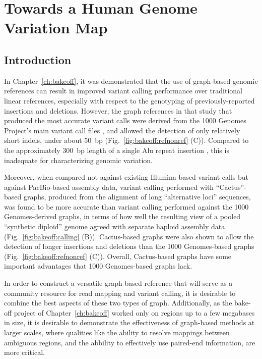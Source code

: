 \chapter{Towards a Human Genome Variation Map}

\newcommand{\vg}{\texttt{vg}\xspace}

\section{Introduction}

In Chapter~\ref{ch:bakeoff}, it was demonstrated that the use of graph-based genomic references can result in improved variant calling performance over traditional linear references, especially with respect to the genotyping of previously-reported insertions and deletions. However, the graph references in that study that produced the most accurate variant calls were derived from the 1000 Genomes Project's main variant call files \cite{10002015global}, and allowed the detection of only relatively short indels, under about 50~bp (Fig.~\ref{fig:bakeoff:refnonref} (C)). Compared to the approximately 300~bp length of a single Alu repeat insertion \cite{weiner1980abundant}, this is inadequate for characterizing genomic variation.

Moreover, when compared not against existing Illumina-based variant calls but against PacBio-based assembly data, variant calling performed with ``Cactus''-based graphs, produced from the alignment of long ``alternative loci'' sequences, was found to be more accurate than variant calling performed against the 1000 Genomes-derived graphs, in terms of how well the resulting view of a pooled ``synthetic diploid'' genome agreed with separate haploid assembly data (Fig.~\ref{fig:bakeoff:calling} (B)). Cactus-based graphs were also shown to allow the detection of longer insertions and deletions than the 1000 Genomes-based graphs (Fig.~\ref{fig:bakeoff:refnonref} (C)). Overall, Cactus-based graphs have some important advantages that 1000 Genomes-based graphs lack.

In order to construct a versatile graph-based reference that will serve as a community resource for read mapping and variant calling, it is desirable to combine the best aspects of these two types of graph. Additionally, as the bake-off project of Chapter~\ref{ch:bakeoff} worked only on regions up to a few megabases in size, it is desirable to demonstrate the effectiveness of graph-based methods at larger scales, where qualities like the ability to resolve mappings between ambiguous regions, and the abbility to effectively use paired-end information, are more critical.

